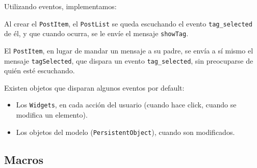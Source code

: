 Utilizando eventos, implementamos:


Al crear el \verb'PostItem', el \verb'PostList' se queda escuchando el evento \verb'tag_selected' de él, y que cuando ocurra, se le envíe el mensaje \verb'showTag'.


El \verb'PostItem', en lugar de mandar un mensaje a su padre, se envía a sí mismo el mensaje \verb'tagSelected', que dispara un evento \verb'tag_selected', sin preocuparse de quién esté escuchando.

Existen objetos que disparan algunos eventos por default:
\begin{itemize}
\item Los \verb"Widgets", en cada acción del usuario (cuando hace click, cuando se modifica un elemento).
\item Los objetos del modelo (\verb"PersistentObject"), cuando son modificados.
\end{itemize}




\subsection{Macros}
\label{sub-macros}

